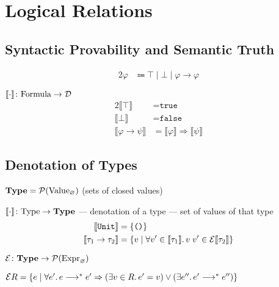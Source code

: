 \chapter{Logical Relations}

\section{Syntactic Provability and Semantic Truth}


\newcommand\Denot[1]{\llbracket#1\rrbracket}
\begin{alignat*}{2}
  \varphi & \Coloneqq \top \mid \bot \mid \varphi \to \varphi
\end{alignat*}

$\Denot{\cdot} \colon \syncatset{Formula} \to \mathcal{D}$
\begin{alignat*}{2}
  \Denot{\top} & = \texttt{true} \\
  \Denot{\bot} & = \texttt{false} \\
  \Denot{\varphi \to \psi} & = \Denot{\varphi} \Rightarrow \Denot{\psi}
\end{alignat*}

\section{Denotation of Types}

$\textbf{Type} = \mathcal{P}(\mathrm{Value}_{\varnothing})$
(sets of closed values)

$\Denot{\cdot} \colon \syncatset{Type} \to \semcatset{Type}$ ---
  denotation of a type --- set of values of that type
\begin{alignat*}{2}
  \Denot{\texttt{Unit}} & = \{\texttt{()}\} \\
  \Denot{\tau_1 \to \tau_2} & = \{ v \mid
    \forall v' \in \Denot{\tau_1}\ldotp v\;v' \in \mathcal{E}\Denot{\tau_2} \}
\end{alignat*}

$\mathcal{E} \colon \textbf{Type} \to
  \mathcal{P}(\mathrm{Expr}_{\varnothing})$

$\mathcal{E}R = \{ e \mid \forall e'\ldotp e \longrightarrow^* e'
  \Rightarrow (\exists v \in R \ldotp e'=v) \lor
    (\exists e'' \ldotp e'\longrightarrow^*e'') \}$

